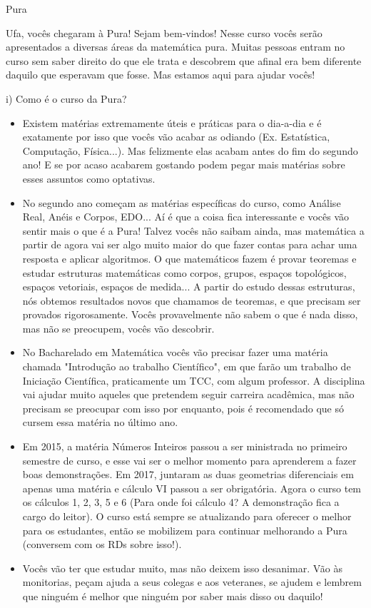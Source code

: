 \begin{subsecao}{Pura}


Ufa, vocês chegaram à Pura! Sejam bem-vindos! Nesse curso vocês serão apresentados a
diversas áreas da matemática pura. Muitas pessoas entram no curso
sem saber direito do que ele trata e descobrem que afinal era bem diferente
daquilo que esperavam que fosse. Mas estamos aqui para ajudar vocês!


i) Como é o curso da Pura?
\begin{itemize}
\item  Existem matérias extremamente úteis e práticas para o dia-a-dia e é
exatamente por isso que vocês vão acabar as odiando (Ex. Estatística,
Computação, Física...). Mas felizmente elas acabam antes do fim do segundo ano!
E se por acaso acabarem gostando podem pegar mais matérias sobre esses assuntos
como optativas.
\item No segundo ano começam as matérias específicas do curso, como Análise Real,
Anéis e Corpos, EDO... Aí é que a coisa fica interessante e vocês vão sentir
mais o que é a Pura! Talvez vocês não saibam ainda, mas matemática a partir de
agora vai ser algo muito maior do que fazer contas para achar uma resposta e aplicar
algoritmos. O que matemáticos fazem é provar teoremas e estudar estruturas matemáticas como corpos, grupos,
espaços topológicos, espaços vetoriais, espaços de medida...
A partir do estudo dessas estruturas, nós obtemos resultados novos que chamamos de teoremas, e que precisam
ser provados rigorosamente. Vocês provavelmente não sabem o que é nada disso, mas não se preocupem, vocês vão descobrir.
\item No Bacharelado em Matemática vocês vão precisar fazer uma matéria chamada "Introdução 
ao trabalho Científico", em que farão um trabalho de Iniciação Científica, praticamente um TCC, com algum 
professor. A disciplina vai ajudar muito aqueles que pretendem seguir carreira acadêmica, mas não
precisam se preocupar com isso por enquanto, pois é recomendado que só cursem essa matéria no último ano.
\item Em 2015, a matéria Números Inteiros passou a ser ministrada no primeiro
semestre de curso, e esse vai ser o melhor momento para aprenderem a fazer boas
demonstrações. Em 2017, juntaram as duas geometrias diferenciais em apenas uma
matéria e cálculo VI passou a ser obrigatória. Agora o curso tem os cálculos 1, 2, 3,
5 e 6 (Para onde foi cálculo 4? A demonstração fica a cargo do leitor).
O curso está sempre se atualizando para oferecer o melhor para os estudantes,
então se mobilizem para continuar melhorando a Pura (conversem com os RDs sobre isso!).
\item  Vocês vão ter que estudar muito, mas não deixem isso desanimar. Vão às monitorias,
peçam ajuda a seus colegas e aos veteranes, se ajudem e lembrem que ninguém é melhor 
que ninguém por saber mais disso ou daquilo!


\end{itemize}
\end{subsecao}
